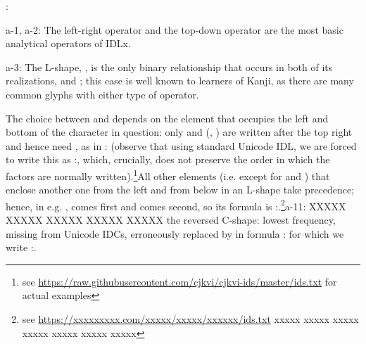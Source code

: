 \vspace{\myLineheight}\begin{multicols}{2}:

{\mktsStyleBold{}a-1}, {\mktsStyleBold{}a-2}: The left-right operator \cjkgGlue{} and the top-down operator \cjkgGlue{}
are the most basic analytical operators of IDLx.

{\mktsStyleBold{}a-3}: The L-shape, \cjkgGlue{}, is the only binary relationship that occurs in both of
its realizations, \cjkgGlue{} and \cjkgGlue{}; this case is well known to learners of Kanji, as
there are many common glyphs with either type of operator.

The choice between \cjkgGlue{} and \cjkgGlue{} depends on the element that occupies the left and bottom of the character in
question: only \cjkgGlue{} and \cjkgGlue{} (\cjkgGlue{}, \cjkgGlue{}) are written {\mktsStyleItalic{}after\/} the top right and hence
need \cjkgGlue{}, as in \cjkgGlue{}:\cjkgGlue{} (observe that using standard Unicode IDL, we are forced to write
this as
\cjkgGlue{}:\cjkgGlue{}\cjkgGlue{}, which,
crucially, does not preserve the order in which the factors are normally written).\footnote{see
\url{https://raw.githubusercontent.com/cjkvi/cjkvi-ids/master/ids.txt} for actual examples}All other elements (i.e. except for \cjkgGlue{} and \cjkgGlue{}) that enclose another one from the left and
from below in an L-shape take precedence; hence, in e.g. \cjkgGlue{}, \cjkgGlue{} comes first and \cjkgGlue{}
comes second, so its formula is \cjkgGlue{}:\cjkgGlue{}\cjkgGlue{}.\footnote{see
\url{https://xxxxxxxxx.com/xxxxx/xxxxx/xxxxxx/ids.txt} xxxxx xxxxx xxxxx
 xxxxx xxxxx xxxxx xxxxx}{\mktsStyleBold{}a-11}: XXXXX XXXXX XXXXX XXXXX XXXXX the reversed C-shape: lowest frequency, missing from Unicode IDCs,
erroneously replaced by \cjkgGlue{} in formula
\cjkgGlue{}:\cjkgGlue{}\cjkgGlue{} for which we write \cjkgGlue{}:\cjkgGlue{}\cjkgGlue{}.


\end{multicols}
